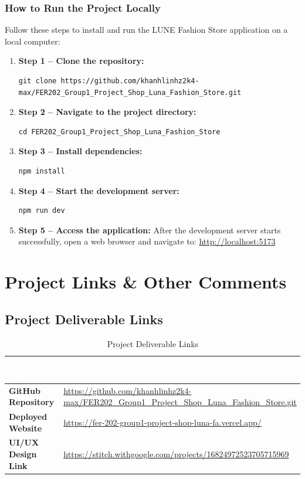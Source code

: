 \documentclass[12pt,a4paper,oneside]{report}
\begin{document}
\subsection{How to Run the Project Locally}
Follow these steps to install and run the LUNE Fashion Store application on a local computer:
\begin{enumerate}[leftmargin=1.2cm]
    \item \textbf{Step 1 -- Clone the repository:}
\begin{verbatim}
git clone https://github.com/khanhlinhz2k4-max/FER202_Group1_Project_Shop_Luna_Fashion_Store.git
\end{verbatim}
    \item \textbf{Step 2 -- Navigate to the project directory:}
\begin{verbatim}
cd FER202_Group1_Project_Shop_Luna_Fashion_Store
\end{verbatim}
    \item \textbf{Step 3 -- Install dependencies:}
\begin{verbatim}
npm install
\end{verbatim}
    \item \textbf{Step 4 -- Start the development server:}
\begin{verbatim}
npm run dev
\end{verbatim}
    \item \textbf{Step 5 -- Access the application:}
    After the development server starts successfully, open a web browser and navigate to:
    \url{http://localhost:5173}
\end{enumerate}

\chapter{Project Links \& Other Comments}

\section{Project Deliverable Links}
\begin{table}[H]
\centering
\begin{tabular}{|p{4.5cm}|p{11.0cm}|}
\hline
\rowcolor{PrimaryBrown}
\textcolor{white}{\textbf{Deliverable Item}} & \textcolor{white}{\textbf{URL / Access Link}} \\
\hline
\textbf{GitHub Repository} & \url{https://github.com/khanhlinhz2k4-max/FER202_Group1_Project_Shop_Luna_Fashion_Store.git} \\
\hline
\textbf{Deployed Website} & \url{https://fer-202-group1-project-shop-luna-fa.vercel.app/} \\
\hline
\textbf{UI/UX Design Link} & \url{https://stitch.withgoogle.com/projects/16824972523705715969} \\
\hline
\end{tabular}
\caption{Project Deliverable Links}
\end{table}
\end{document}

